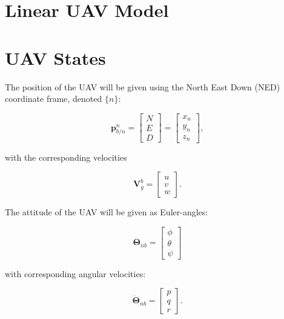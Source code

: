 \section{Linear UAV Model}



\section{UAV States}

The position of the UAV will be given using the North East Down (NED) coordinate frame, denoted $\{n\}$:

\begin{equation}
	\mathbf{p}_{b/n}^n =
	\begin{bmatrix}
		N \\ E \\ D
	\end{bmatrix}
	=
	\begin{bmatrix}
		x_n \\ y_n \\ z_n
	\end{bmatrix},
\end{equation}

with the corresponding velocities

\begin{equation}
	\mathbf{V}^b_g =
	\begin{bmatrix}
		u \\ v \\ w
	\end{bmatrix}.
\end{equation}

The attitude of the UAV will be given as Euler-angles:

\begin{equation}
	\bm{\Theta}_{nb} =
	\begin{bmatrix}
		\phi \\ \theta \\ \psi
	\end{bmatrix}	
\end{equation}

with corresponding angular velocities:

\begin{equation}
	\dot{\bm{\Theta}}_{nb} =
	\begin{bmatrix}
		p \\ q \\ r
	\end{bmatrix}.
\end{equation}


